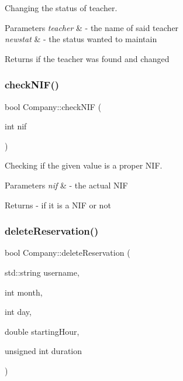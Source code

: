 Changing the status of teacher. 


\begin{DoxyParams}{Parameters}
{\em teacher} & -\/ the name of said teacher \\
\hline
{\em newstat} & -\/ the status wanted to maintain \\
\hline
\end{DoxyParams}
\begin{DoxyReturn}{Returns}
if the teacher was found and changed 
\end{DoxyReturn}
\mbox{\label{class_company_a53a891acc19de4d24a82fd9f108cfe68}} 
\subsubsection{\texorpdfstring{check\+N\+I\+F()}{checkNIF()}}
{\footnotesize\ttfamily bool Company\+::check\+N\+IF (\begin{DoxyParamCaption}\item[{int}]{nif }\end{DoxyParamCaption})}



Checking if the given value is a proper N\+IF. 


\begin{DoxyParams}{Parameters}
{\em nif} & -\/ the actual N\+IF \\
\hline
\end{DoxyParams}
\begin{DoxyReturn}{Returns}
-\/ if it is a N\+IF or not 
\end{DoxyReturn}
\mbox{\label{class_company_ad6819fd8a928fd10123ad24ca640325c}} 
\subsubsection{\texorpdfstring{delete\+Reservation()}{deleteReservation()}}
{\footnotesize\ttfamily bool Company\+::delete\+Reservation (\begin{DoxyParamCaption}\item[{std\+::string}]{username,  }\item[{int}]{month,  }\item[{int}]{day,  }\item[{double}]{starting\+Hour,  }\item[{unsigned int}]{duration }\end{DoxyParamCaption})}



